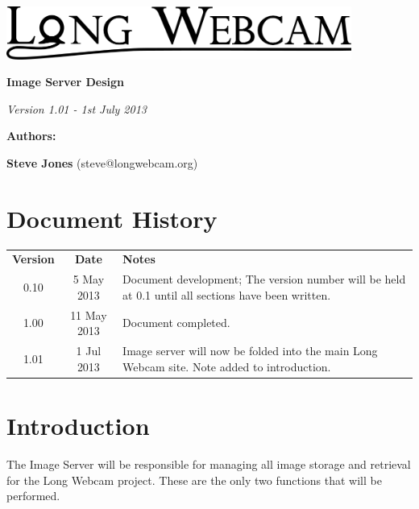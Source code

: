 \documentclass[11pt]{article}
\begin{document}
\begin{titlepage}
\begin{center}

\includegraphics[width=0.85\textwidth]{./Logo_Large-cropped_black.png}

\vspace{3 cm}

\textbf{\Huge{Image Server Design}}

\vspace{1 cm}

\textit{\large{Version 1.01 - 1st July 2013}}

\vspace{4 cm}

\textbf{\Large{Authors:}}

\textbf{Steve Jones} (steve@longwebcam.org)

\end{center}

\end{titlepage}

\setcounter{tocdepth}{2}
\tableofcontents
\clearpage
{}
\section*{Document History}
\begin{table}[tbhp!]
\begin{tabular}{ c c p{4in} }
\textbf{Version} & \textbf{Date} & \textbf{Notes} \\
0.10 & 5 May 2013 & Document development; The version number will be held at 0.1 until all sections have been written. \\
1.00 & 11 May 2013 & Document completed. \\
1.01 & 1 Jul 2013 & Image server will now be folded into the main Long Webcam site. Note added to introduction.
\end{tabular}
\end{table}

\clearpage
{}


\section{Introduction}
The Image Server will be responsible for managing all image storage and retrieval for the Long Webcam project. These are the only two functions that will be performed.
\end{document}
